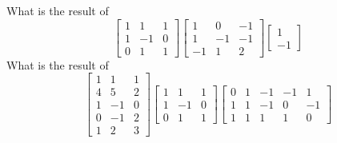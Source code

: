 \bexo
What is the result of 
\begin{equation*}
\left[
\begin{array}{ccc}
1& 1& 1\\
1& -1& 0\\
0& 1& 1
\end{array}
\right]
\left[
\begin{array}{ccc}
1& 0& -1\\
1& -1& -1\\
-1& 1 &2
\end{array}
\right]
\left[
\begin{array}{c}
1\\
-1
\end{array}
\right]
\end{equation*}
\eexo
\solution{
\begin{equation*}
\left[
\begin{array}{c}
1\\
-1
\end{array}
\right]
\end{equation*}
}
\bexo
What is the result of 
\begin{equation*}
\left[
\begin{array}{ccc}
1  &   1  &   1\\
4  &   5  &   2\\
1  &  -1  &   0\\
0  &  -1  &   2\\
1  &   2  &   3
\end{array}
\right]
\left[
\begin{array}{ccc}
1  &   1  &   1\\
1  &  -1  &   0\\
0  &   1  &   1
\end{array}
\right]
\left[
\begin{array}{ccccc}
0  &   1  &  -1  &  -1  &   1\\
1  &   1  &  -1  &   0  &  -1\\
1  &   1  &   1  &   1  &   0
\end{array}
\right]
\end{equation*}
\eexo
{}
